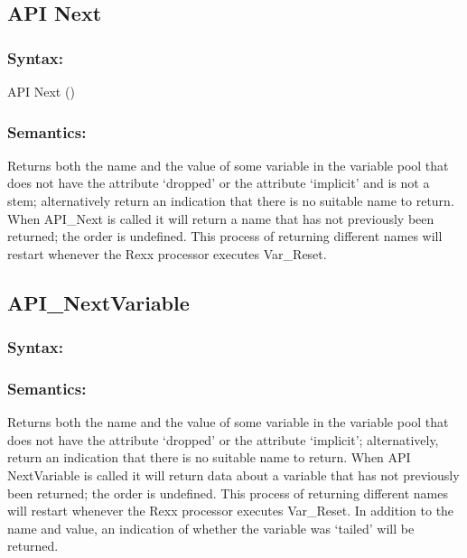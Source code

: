 \subsection{API Next}\label{api-next}

\subsubsection{Syntax:}\label{syntax-57}

API Next ()

\subsubsection{Semantics:}\label{semantics-58}

Returns both the name and the value of some variable in the variable
pool that does not have the attribute `dropped' or the attribute
`implicit' and is not a stem; alternatively return an indication that
there is no suitable name to return. When API\_Next is called it will
return a name that has not previously been returned; the order is
undefined. This process of returning different names will restart
whenever the Rexx processor executes Var\_Reset.

\subsection{API\_NextVariable}\label{api_nextvariable}

\subsubsection{Syntax:}\label{syntax-58}



\subsubsection{Semantics:}\label{semantics-59}

Returns both the name and the value of some variable in the variable
pool that does not have the attribute `dropped' or the attribute
`implicit'; alternatively, return an indication that there is no
suitable name to return. When API NextVariable is called it will return
data about a variable that has not previously been returned; the order
is undefined. This process of returning different names will restart
whenever the Rexx processor executes Var\_Reset. In addition to the name
and value, an indication of whether the variable was `tailed' will be
returned.

